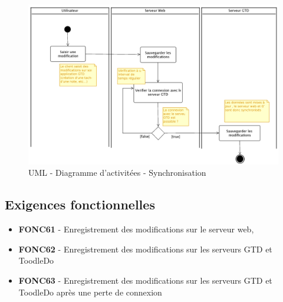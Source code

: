   \begin{figure}[H]
  \begin{center}
  \includegraphics[scale=0.2]{diagrams/activiteSynch.png}
  \caption{UML - Diagramme d'activitées - Synchronisation}
  \label{fig:Architecture Generale}
  \end{center}
  \end{figure}

\subsection{Exigences fonctionnelles}


\begin{itemize}	\renewcommand{\labelitemi}{}
	\item \textbf{FONC61} - Enregistrement des modifications sur le serveur web,
	\item \textbf{FONC62} - Enregistrement des modifications sur les serveurs GTD et ToodleDo
	\item \textbf{FONC63} - Enregistrement des modifications sur les serveurs GTD et ToodleDo après une perte de connexion
\end{itemize}
		
